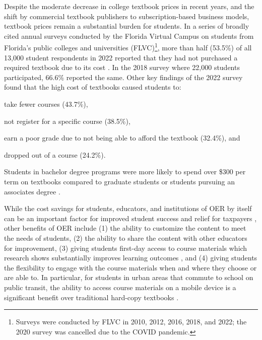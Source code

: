 \documentclass[11pt]{article}
\begin{document}
Despite the moderate decrease in college textbook prices in recent years, and the shift by commercial textbook publishers to subscription-based business models, textbook prices remain a substantial burden for students.  In a series of broadly cited annual surveys conducted by the Florida Virtual Campus on students from Florida's public colleges and universities (FLVC)\footnote{Surveys were conducted by FLVC in 2010, 2012, 2016, 2018, and 2022; the 2020 survey was cancelled due to the COVID pandemic.}, more than half (53.5\%) of all 13,000 student respondents in 2022 reported that they had not purchased a required textbook due to its cost \cite{flvc2022}. In the 2018 survey where 22,000 students participated, 66.6\% reported the same.  Other key findings of the 2022 survey found that the high cost of textbooks caused students to:
\begin{compactitem}
\item take fewer courses (43.7\%),
\item not register for a specific course (38.5\%),
\item earn a poor grade due to not being able to afford the textbook (32.4\%), and
\item dropped out of a course (24.2\%).
\end{compactitem}
Students in bachelor degree programs were more likely to spend over \$300 per term on textbooks compared to graduate students or students pursuing an associates degree \cite{flvc2022}.  

While the cost savings for students, educators, and institutions of OER by itself can be an important factor for improved student success and relief for taxpayers \cite{TB-JR-JH:13, RF-RP-BD:15, CW-DD-SC:17}, other benefits of OER include (1) the ability to customize the content to meet the needs of students, (2) the ability to share the content with other educators for improvement, (3) giving students first-day access to course materials which research shows substantially improves learning outcomes \cite{LA:2017}, and (4) giving students the flexibility to engage with the course materials when and where they choose or are able to.  In particular, for students in urban areas that commute to school on public transit, the ability to access course materials on a mobile device is a significant benefit over traditional hard-copy textbooks \cite{CC:17, MS:14}.
\end{document}
